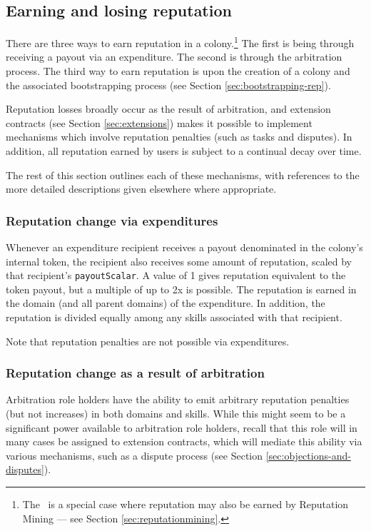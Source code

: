 \subsection{Earning and losing reputation}\label{sec:earning-losing-rep}
There are three ways to earn reputation in a colony.\footnote{The \rc\ is a special case where reputation may also be earned by Reputation Mining --- see Section \ref{sec:reputationmining}.} The first is being through receiving a payout via an expenditure. The second is through the arbitration process. The third way to earn reputation is upon the creation of a colony and the associated bootstrapping process (see Section \ref{sec:bootstrapping-rep}).

Reputation losses broadly occur as the result of arbitration, and extension contracts (see Section \ref{sec:extensions}) makes it possible to implement mechanisms which involve reputation penalties (such as tasks and disputes). In addition, all reputation earned by users is subject to a continual decay over time.

The rest of this section outlines each of these mechanisms, with references to the more detailed descriptions given elsewhere where appropriate.

\subsubsection{Reputation change via expenditures}

Whenever an expenditure recipient receives a payout denominated in the colony's internal token, the recipient also receives some amount of reputation, scaled by that recipient's \texttt{payoutScalar}. A value of 1 gives reputation equivalent to the token payout, but a multiple of up to 2x is possible. The reputation is earned in the domain (and all parent domains) of the expenditure. In addition, the reputation is divided equally among any skills associated with that recipient.

Note that reputation penalties are not possible via expenditures.

\subsubsection{Reputation change as a result of arbitration}\label{sec:earning-rep-in-disputes}

Arbitration role holders have the ability to emit arbitrary reputation penalties (but not increases) in both domains and skills. While this might seem to be a significant power available to arbitration role holders, recall that this role will in many cases be assigned to extension contracts, which will mediate this ability via various mechanisms, such as a dispute process (see Section \ref{sec:objections-and-disputes}).

